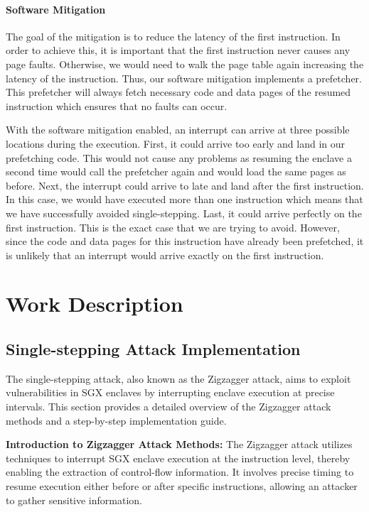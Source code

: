 \documentclass{llncs}
\begin{document}
\paragraph{Software Mitigation}
The goal of the mitigation is to reduce the latency of the first instruction.
In order to achieve this, it is important that the first instruction never
causes any page faults.
Otherwise, we would need to walk the page table again increasing the latency of
the instruction.
Thus, our software mitigation implements a prefetcher.
This prefetcher will always fetch necessary code and data pages of the resumed
instruction which ensures that no faults can occur.

With the software mitigation enabled, an interrupt can arrive at three possible
locations during the execution.
First, it could arrive too early and land in our prefetching code.
This would not cause any problems as resuming the enclave a second time would
call the prefetcher again and would load the same pages as before.
Next, the interrupt could arrive to late and land after the first instruction.
In this case, we would have executed more than one instruction which means
that we have successfully avoided single-stepping.
Last, it could arrive perfectly on the first instruction.
This is the exact case that we are trying to avoid.
However, since the code and data pages for this instruction have already been prefetched,
it is unlikely that an interrupt would arrive exactly on the first instruction.

\section{Work Description}

\subsection{Single-stepping Attack Implementation}

The single-stepping attack, also known as the Zigzagger attack, aims to exploit vulnerabilities in SGX enclaves by interrupting enclave execution at precise intervals. This section provides a detailed overview of the Zigzagger attack methods and a step-by-step implementation guide.

\textbf{Introduction to Zigzagger Attack Methods:}
The Zigzagger attack utilizes techniques to interrupt SGX enclave execution at the instruction level, thereby enabling the extraction of control-flow information. It involves precise timing to resume execution either before or after specific instructions, allowing an attacker to gather sensitive information.
\end{document}
